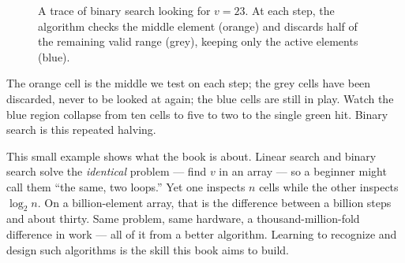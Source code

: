 \begin{figure}[htbp]
\centering
{}
\caption{A trace of binary search looking for $v=23$. At each step, the algorithm checks the middle element (orange) and discards half of the remaining valid range (grey), keeping only the active elements (blue).}
\label{fig:ch00-binary-search}
\end{figure}

The orange cell is the middle we test on each step; the grey cells have been
discarded, never to be looked at again; the blue cells are still in play. Watch
the blue region collapse from ten cells to five to two to the single green hit.
Binary search is this repeated halving.

\begin{intuitionbox}
This small example shows what the book is about. Linear search and binary
search solve the \emph{identical} problem --- find $v$ in an array --- so a
beginner might call them ``the same, two loops.'' Yet one
inspects $n$ cells while the other inspects $\log_2 n$. On a billion-element
array, that is the difference between a billion steps and about thirty. Same problem, same
hardware, a thousand-million-fold difference in work --- all of it from a
better algorithm. Learning to recognize and design such algorithms is the skill
this book aims to build.
\end{intuitionbox}

